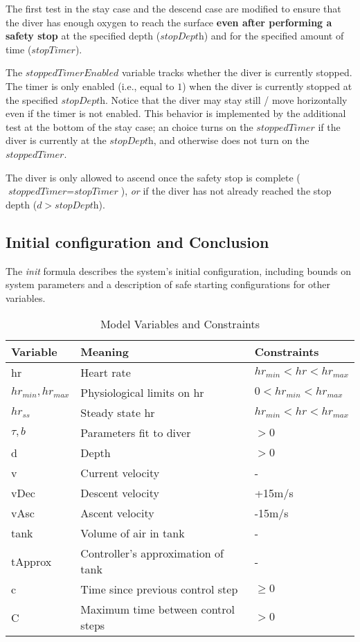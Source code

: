 \documentclass[sigconf,screen]{acmart}
\newcommand{\stoppedTimer}{\textit{stoppedTimer}}
\newcommand{\stopTime}{\textit{stopTimer}}
\newcommand{\stopDepth}{\textit{stopDepth}}
\newcommand{\stoppedTimerEnabled}{\textit{stoppedTimerEnabled}}
\begin{document}
The first test in the stay case and the descend case are modified to ensure that the diver has enough oxygen to
reach the surface \textbf{even after performing a safety stop} at the specified depth ($\stopDepth$) and for the
specified amount of time ($\stopTime$).

The $\stoppedTimerEnabled$ variable tracks whether the diver is currently stopped.
The timer is only enabled (i.e., equal to $1$) when the diver is currently stopped at the specified $\stopDepth$.
Notice that the diver may stay still / move horizontally even if the timer is not enabled.
This behavior is implemented by the additional test at the bottom of the stay case;
an choice turns on the $\stoppedTimer$ if the diver is currently at the
$\stopDepth$, and otherwise does not turn on the $\stoppedTimer$.

The diver is only allowed to ascend once the safety stop is complete ($\stoppedTimer = \stopTime$), \emph{or} if the diver has not already
reached the stop depth ($d > \stopDepth$).



\subsection{Initial configuration and Conclusion}
The \textit{init} formula describes the system's initial configuration,
including bounds on system parameters and a description of safe starting configurations for other variables.

\begin{table*}
  \caption{Model Variables and Constraints}
  \label{tab:vars}
  \begin{tabular}{lll}
    \toprule
    Variable & Meaning & Constraints\\
    \midrule
    hr & Heart rate & $hr_{min}<hr<hr_{max}$\\
    $hr_{min}, hr_{max}$ & Physiological limits on hr & $0<hr_{min}<hr_{max}$\\
    $hr_{ss}$ & Steady state hr & $hr_{min}<hr<hr_{max}$\\
    $\tau,b$ & Parameters fit to diver& $>0$\\ \hline
    d & Depth & $>0$\\
    v & Current velocity & - \\
    vDec& Descent velocity & +15m/s\\ 
    vAsc & Ascent velocity & -15m/s\\ \hline 
    tank & Volume of air in tank & - \\
    tApprox & Controller's approximation of tank & - \\ \hline
    c & Time since previous control step & $\geq0$\\
    C & Maximum time between control steps & $>0$\\ 
  \bottomrule
\end{tabular}
\end{table*}
\end{document}
